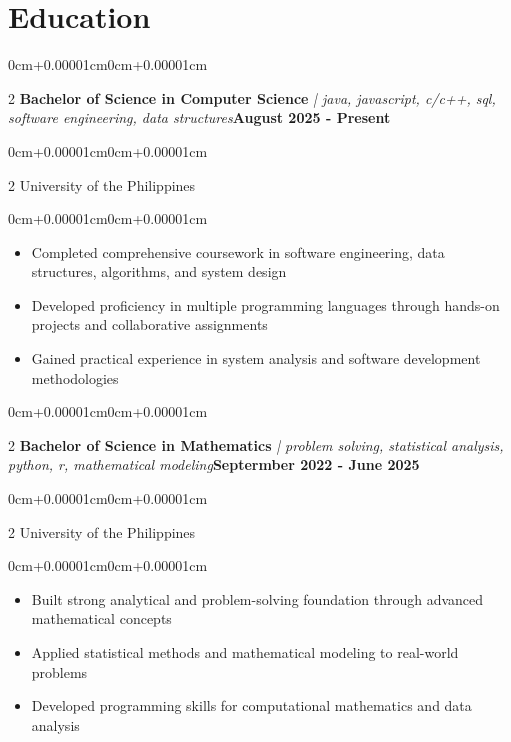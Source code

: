 \documentclass[10pt, letterpaper]{article}
\newenvironment{highlights}{\begin{itemize}[topsep=0.10cm,parsep=0.10cm,partopsep=0pt,itemsep=0pt,leftmargin=0cm+10pt]}{\end{itemize}}
\newenvironment{onecolentry}{\begin{adjustwidth}{0cm+0.00001cm}{0cm+0.00001cm}}{\end{adjustwidth}}
\newenvironment{twocolentry}[2][]{\onecolentry\def\secondColumn{#2}\setcolumnwidth{\fill,5cm}\begin{paracol}{2}}{\switchcolumn \raggedleft \secondColumn\end{paracol}\endonecolentry}
\begin{document}
\section{Education}

    \begin{twocolentry}{\textbf{August 2025 - Present}}
    \textbf{Bachelor of Science in Computer Science}\textit{ | java, javascript, c/c++, sql, software engineering, data structures}\end{twocolentry}
    \vspace{0.05cm}
    \begin{twocolentry}{}
    University of the Philippines\end{twocolentry}
    \vspace{0.10cm}
    \begin{onecolentry}
        \begin{highlights}
            \item Completed comprehensive coursework in software engineering, data structures, algorithms, and system design
            \item Developed proficiency in multiple programming languages through hands-on projects and collaborative assignments
            \item Gained practical experience in system analysis and software development methodologies
        \end{highlights}
    \end{onecolentry}
    \vspace{0.15cm}

    \begin{twocolentry}{\textbf{Septermber 2022 - June 2025}}
    \textbf{Bachelor of Science in Mathematics}\textit{ | problem solving, statistical analysis, python, r, mathematical modeling}\end{twocolentry}
    \vspace{0.05cm}
    \begin{twocolentry}{}
    University of the Philippines\end{twocolentry}
    \vspace{0.10cm}
    \begin{onecolentry}
        \begin{highlights}
            \item Built strong analytical and problem-solving foundation through advanced mathematical concepts
            \item Applied statistical methods and mathematical modeling to real-world problems
            \item Developed programming skills for computational mathematics and data analysis
        \end{highlights}
    \end{onecolentry}
    \vspace{0.15cm}
\end{document}
